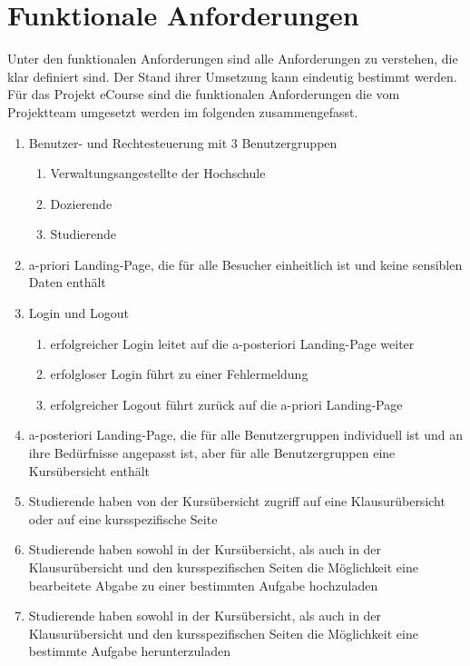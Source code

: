 
\chapter{Funktionale Anforderungen}
\label{sec:funktionale_Anforderungen}
Unter den funktionalen Anforderungen sind alle Anforderungen zu verstehen, die klar definiert sind. Der Stand ihrer Umsetzung kann eindeutig bestimmt werden. \\
Für das Projekt eCourse sind die funktionalen Anforderungen die vom Projektteam umgesetzt werden im folgenden zusammengefasst.\\
\begin{enumerate}
	\item Benutzer- und Rechtesteuerung mit 3 Benutzergruppen
	\begin{enumerate}
		\item \gls{Verwaltungsangestellte} der Hochschule
		\item \gls{Dozierende}
		\item \gls{Studierende}
	\end{enumerate}
	\item a-priori \gls{Landing-Page}, die für alle Besucher einheitlich ist und keine sensiblen Daten enthält
	\item Login und Logout
	\begin{enumerate}
		\item erfolgreicher Login leitet auf die a-posteriori \gls{Landing-Page} weiter
		\item erfolgloser Login führt zu einer Fehlermeldung
		\item erfolgreicher Logout führt zurück auf die a-priori \gls{Landing-Page}
	\end{enumerate}
	\item a-posteriori \gls{Landing-Page}, die für alle Benutzergruppen individuell ist und an ihre Bedürfnisse angepasst ist, aber für alle Benutzergruppen eine Kursübersicht enthält
	\item Studierende haben von der Kursübersicht zugriff auf eine Klausurübersicht oder auf eine \gls{kursspezifische} Seite
	\item \gls{Studierende} haben sowohl in der Kursübersicht, als auch in der Klausurübersicht und den \gls{kursspezifische}n Seiten die Möglichkeit eine bearbeitete Abgabe zu einer bestimmten Aufgabe hochzuladen
	\item \gls{Studierende} haben sowohl in der Kursübersicht, als auch in der Klausurübersicht und den \gls{kursspezifische}n Seiten die Möglichkeit eine bestimmte Aufgabe herunterzuladen

\end{enumerate}

